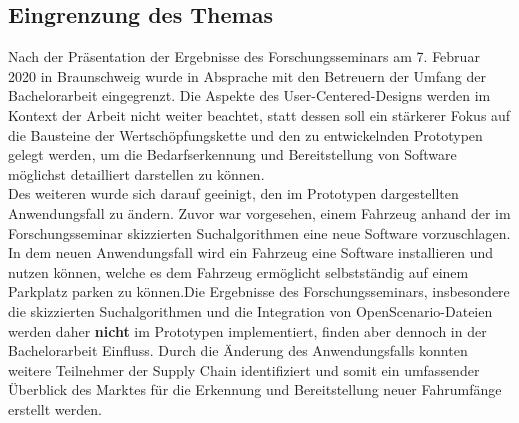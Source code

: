 \subsection{Eingrenzung des Themas}
Nach der Präsentation der Ergebnisse des Forschungsseminars am 7. Februar 2020 in Braunschweig wurde in Absprache mit den Betreuern der Umfang der Bachelorarbeit eingegrenzt. Die Aspekte des User-Centered-Designs werden im Kontext der Arbeit nicht weiter beachtet, statt dessen soll ein stärkerer Fokus auf die Bausteine der Wertschöpfungskette und den zu entwickelnden Prototypen gelegt werden, um die Bedarfserkennung und Bereitstellung von Software möglichst detailliert darstellen zu können.\\
Des weiteren wurde sich darauf geeinigt, den im Prototypen dargestellten Anwendungsfall zu ändern. Zuvor war vorgesehen, einem Fahrzeug anhand der im Forschungsseminar skizzierten Suchalgorithmen eine neue Software vorzuschlagen. In dem neuen Anwendungsfall wird ein Fahrzeug eine Software installieren und nutzen können, welche es dem Fahrzeug ermöglicht selbstständig auf einem Parkplatz parken zu können.Die Ergebnisse des Forschungsseminars, insbesondere die skizzierten Suchalgorithmen und die Integration von OpenScenario-Dateien werden daher \textbf{nicht} im Prototypen implementiert, finden aber dennoch in der Bachelorarbeit Einfluss. Durch die Änderung des Anwendungsfalls konnten weitere Teilnehmer der Supply Chain identifiziert und somit ein umfassender Überblick des Marktes für die Erkennung und Bereitstellung neuer Fahrumfänge erstellt werden.